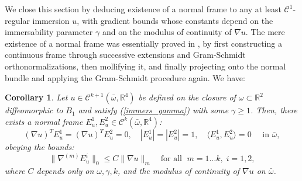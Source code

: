 \documentclass[reqno,twoside,11pt]{amsart}
\newcommand{\R}{\mathbb{R}}
\numberwithin{equation}{section}
\theoremstyle{plain}
\newtheorem{corollary}[theorem]{Corollary}
\theoremstyle{definition}
\begin{document}
\medskip

We close this section by deducing existence of a normal frame to any
at least $\mathcal{C}^1$-regular immersion $u$, with gradient bounds whose constants depend on the
immersability parameter $\gamma$ and on the
modulus of continuity of $\nabla u$. The mere existence of a normal frame was
essentially proved in \cite[Lemma 2.4.1]{Del_masterpieces}, by
first constructing a continuous frame through successive extensions and Gram-Schmidt
orthonormalizations, then mollifying it, and finally
projecting onto the normal bundle and applying the Gram-Schmidt procedure again. We have:

\begin{corollary}\label{lem_normals}
Let $u\in\mathcal{C}^{k+1}(\bar\omega, \R^4)$ be defined on the closure
of $\omega\subset\R^2$ diffeomorphic to $B_1$ and satisfy
(\ref{immers_gamma}) with some $\gamma\geq 1$. Then, there
exists a normal frame $E^1_u, E^2_u\in \mathcal{C}^k(\bar\omega, \R^4)$:
\begin{equation*}
(\nabla u)^T E_u^1 = (\nabla u)^T E_u^2 = 0,\quad |E^1_u|=|E^2_u|=1,
\quad \langle E^1_u, E^2_u\rangle = 0 \quad\mbox{ in } \bar\omega,
\end{equation*}
obeying the bounds:
\begin{equation}\label{stim_nor}
\|\nabla^{(m)}E_u^i\|_0\leq C \|\nabla u\|_m\quad\mbox{
  for all } \; m=1\ldots k, \; i=1,2,
\end{equation}
where $C$ depends only on $\omega, \gamma, k$, and the modulus of
continuity of $\nabla u$ on $\bar\omega$.
\end{corollary}
\end{document}
